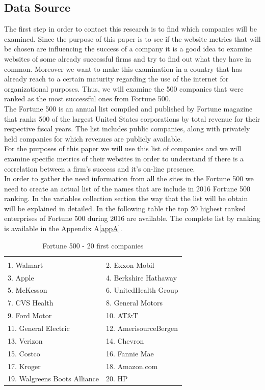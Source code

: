 \documentclass{article}
\begin{document}
\subsection{Data Source}\label{ds:f500}
The first step in order to contact this research is to find which companies will be examined. Since the purpose of this paper is to see if the website metrics that will be chosen are influencing the success of a company it is a good idea to examine websites of some already successful firms and try to find out what they have in common. Moreover we want to make this examination in a country that has already reach to a certain maturity regarding the use of the internet for organizational purposes. Thus, we will examine the 500 companies that were ranked as the most successful ones from Fortune 500.\\
The Fortune 500 is an annual list compiled and published by Fortune magazine that ranks 500 of the largest United States corporations by total revenue for their respective fiscal years. The list includes public companies, along with privately held companies for which revenues are publicly available.\cite{key1, key2}\\
For the purposes of this paper we will use this list of companies and we will examine specific metrics of their websites in order to understand if there is a correlation between a firm's success and it's on-line presence.\\
In order to gather the need information from all the sites in the Fortune 500 we need to create an actual list of the names that are include in 2016 Fortune 500 ranking. In the variables collection section the way that the list will be obtain will be explained in detailed. In the following table the top 20 highest ranked enterprises of Fortune 500 during 2016 are available. The complete list by ranking is available in the Appendix A\ref{appA}.
\begin{table}[H]
\centering
\caption{Fortune 500 - 20 first companies}
\begin{tabular}{ll}
\hline
 \\ 1. Walmart 
&  2. Exxon Mobil 
\\  3. Apple 
& 4. Berkshire Hathaway 
\\  5. McKesson 
&  6. UnitedHealth Group 
\\ 7. CVS Health 
&  8. General Motors 
\\  9. Ford Motor 
& 10. AT\&T 
\\  11. General Electric 
&  12. AmerisourceBergen 
\\ 13. Verizon 
&  14. Chevron 
\\ 15. Costco 
& 16. Fannie Mae 
\\  17. Kroger 
&  18. Amazon.com 
\\ 19. Walgreens Boots Alliance 
&  20. HP 
 \\ \hline
\end{tabular}
\end{table}
\end{document}
